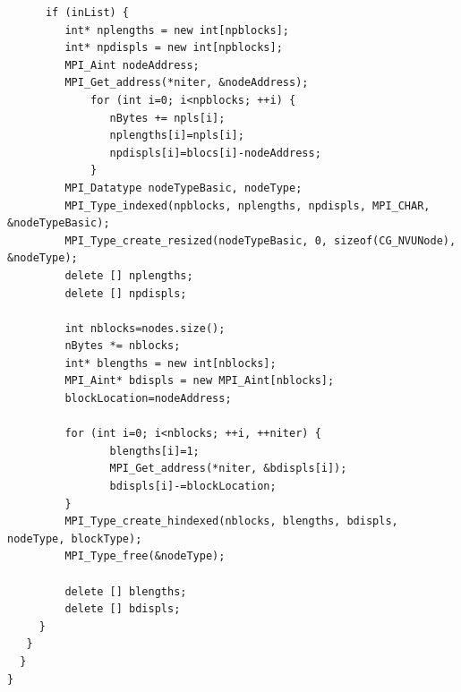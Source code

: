 {\begin{verbatim}
      if (inList) {                                                                                        
         int* nplengths = new int[npblocks];                                                               
         int* npdispls = new int[npblocks];                                                                
         MPI_Aint nodeAddress;                                                                             
         MPI_Get_address(*niter, &nodeAddress);                                                            
             for (int i=0; i<npblocks; ++i) {                                                                  
                nBytes += npls[i];                                                                             
                nplengths[i]=npls[i];                                                                          
                npdispls[i]=blocs[i]-nodeAddress;                                                              
             }                                                                                                 
         MPI_Datatype nodeTypeBasic, nodeType;                                                             
         MPI_Type_indexed(npblocks, nplengths, npdispls, MPI_CHAR, &nodeTypeBasic);                        
         MPI_Type_create_resized(nodeTypeBasic, 0, sizeof(CG_NVUNode), &nodeType);                         
         delete [] nplengths;                                                                              
         delete [] npdispls;                                                                               
                                                                                                           
         int nblocks=nodes.size();                                                                         
         nBytes *= nblocks;                                                                                
         int* blengths = new int[nblocks];                                                                 
         MPI_Aint* bdispls = new MPI_Aint[nblocks];                                                        
         blockLocation=nodeAddress;                                                                        
      
         for (int i=0; i<nblocks; ++i, ++niter) {                                                          
                blengths[i]=1;                                                                                 
                MPI_Get_address(*niter, &bdispls[i]);                                                          
                bdispls[i]-=blockLocation;                                                                     
         }                                                                                                 
         MPI_Type_create_hindexed(nblocks, blengths, bdispls, nodeType, blockType);                        
         MPI_Type_free(&nodeType);                                     
         
         delete [] blengths;
         delete [] bdispls;
     }
   }
  }
}         
\end{verbatim}
}

